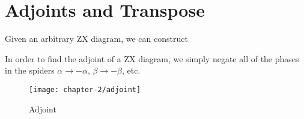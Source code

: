 \section{Adjoints and Transpose}

Given an arbitrary ZX diagram, we can construct

In order to find the adjoint of a ZX diagram, we simply negate all of the phases in the spiders $\alpha \rightarrow -\alpha$, $\beta \rightarrow -\beta$, etc.
\begin{figure}[H]
    \centering
    \texttt{[image: chapter-2/adjoint]}
    \caption{Adjoint}
\end{figure}
